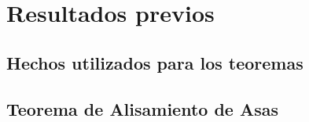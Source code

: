 
\chapter{Resultados previos}


\section{Hechos utilizados para los teoremas}

\section{Teorema de Alisamiento de Asas}

	

\endinput
